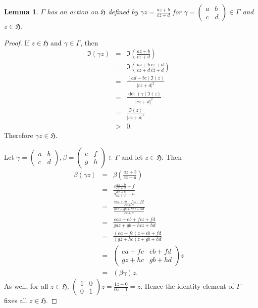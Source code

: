 \documentclass{article}
\newtheorem{lemma}[theorem]{Lemma}
\begin{document}
\begin{lemma}
$\Gamma$ has an action on $\mathfrak{H}$ defined by $\gamma z=\frac{az+b}{cz+d}$ for $\gamma=\begin{pmatrix}a&b\\c&d\end{pmatrix} \in \Gamma$ and
$z \in \mathfrak{H}$.
\end{lemma}
\begin{proof}
If $z \in \mathfrak{H}$ and $\gamma \in \Gamma$, then
\begin{eqnarray*}
\Im(\gamma z)&=&\Im(\frac{az+b}{cz+d})\\
&=&\Im(\frac{az+b}{cz+d} \frac{c\overline{z}+d}{c\overline{z}+d})\\
&=&\frac{(ad-bc)\Im(z)}{|cz+d|^2}\\
&=&\frac{\det(\gamma) \Im(z)}{|cz+d|^2}\\
&=&\frac{\Im(z)}{|cz+d|^2}\\
&>&0.
\end{eqnarray*}
Therefore $\gamma z \in \mathfrak{H}$.

Let $\gamma=\begin{pmatrix}a&b\\c&d\end{pmatrix}, \beta=\begin{pmatrix}e&f\\g&h\end{pmatrix} \in \Gamma$ and
let $z \in \mathfrak{H}$. Then
\begin{eqnarray*}
\beta(\gamma z)&=&\beta(\frac{az+b}{cz+d})\\
&=&\frac{e\frac{az+b}{cz+d}+f}{g\frac{az+b}{cz+d}+h}\\
&=&\frac{\frac{eaz+eb+fcz+fd}{cz+d}}{\frac{gaz+gb+hcz+hd}{cz+d}}\\
&=&\frac{eaz+eb+fcz+fd}{gaz+gb+hcz+hd}\\
&=&\frac{(ea+fc)z+eb+fd}{(gz+hc)z+gb+hd}\\
&=&\begin{pmatrix}ea+fc&eb+fd\\gz+hc&gb+hd\end{pmatrix}z\\
&=&(\beta \gamma)z.
\end{eqnarray*}
As well, for all $z \in \mathfrak{H}$,
$\begin{pmatrix}1&0\\0&1\end{pmatrix}z=
\frac{1z+0}{0z+1}=z$. Hence the identity element of
$\Gamma$ fixes all $z \in \mathfrak{H}$.
\end{proof}
\end{document}
